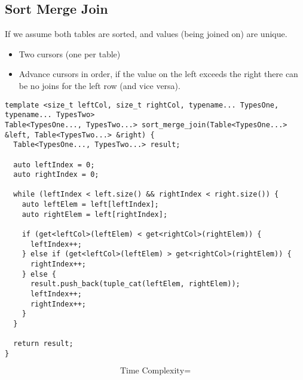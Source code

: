 \subsection{Sort Merge Join}
If we assume both tables are sorted, and values (being joined on) are unique.
\begin{itemize}
  \item Two cursors (one per table)
  \item Advance cursors in order, if the value on the left exceeds the right there can be no joins for the left row (and vice versa).
\end{itemize}
\begin{verbatim}
template <size_t leftCol, size_t rightCol, typename... TypesOne, typename... TypesTwo>
Table<TypesOne..., TypesTwo...> sort_merge_join(Table<TypesOne...> &left, Table<TypesTwo...> &right) {
  Table<TypesOne..., TypesTwo...> result;

  auto leftIndex = 0;
  auto rightIndex = 0;

  while (leftIndex < left.size() && rightIndex < right.size()) {
    auto leftElem = left[leftIndex];
    auto rightElem = left[rightIndex];

    if (get<leftCol>(leftElem) < get<rightCol>(rightElem)) {
      leftIndex++;
    } else if (get<leftCol>(leftElem) > get<rightCol>(rightElem)) {
      rightIndex++;
    } else {
      result.push_back(tuple_cat(leftElem, rightElem));
      leftIndex++;
      rightIndex++;
    }
  }

  return result;
}
\end{verbatim}
\[\text{Time Complexity} = \]
\unfinished